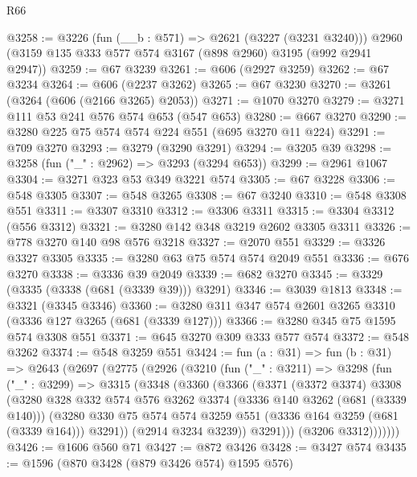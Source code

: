 \begin{lexlean}{R66}
\begin{coremodule}
@3258 := @3226
    (fun (__b : @571) => @2621 (@3227 (@3231 @3240)))
    @2960
    (@3159 @135 @333 @577 @574 @3167 (@898 @2960) @3195 (@992 @2941 @2947))
@3259 := @67 @3239
@3261 := @606 (@2927 @3259)
@3262 := @67 @3234
@3264 := @606 (@2237 @3262)
@3265 := @67 @3230
@3270 := @3261 (@3264 (@606 (@2166 @3265) @2053))
@3271 := @1070 @3270
@3279 := @3271 @111 @53 @241 @576 @574 @653 (@547 @653)
@3280 := @667 @3270
@3290 := @3280 @225 @75 @574 @574 @224 @551 (@695 @3270 @11 @224)
@3291 := @709 @3270
@3293 := @3279 (@3290 @3291)
@3294 := @3205 @39
@3298 := @3258 (fun ("_" : @2962) => @3293 (@3294 @653))
@3299 := @2961 @1067
@3304 := @3271 @323 @53 @349 @3221 @574
@3305 := @67 @3228
@3306 := @548 @3305
@3307 := @548 @3265
@3308 := @67 @3240
@3310 := @548 @3308 @551
@3311 := @3307 @3310
@3312 := @3306 @3311
@3315 := @3304 @3312 (@556 @3312)
@3321 := @3280 @142 @348 @3219 @2602 @3305 @3311
@3326 := @778 @3270 @140 @98 @576 @3218
@3327 := @2070 @551
@3329 := @3326 @3327 @3305
@3335 := @3280 @63 @75 @574 @574 @2049 @551
@3336 := @676 @3270
@3338 := @3336 @39 @2049
@3339 := @682 @3270
@3345 := @3329 (@3335 (@3338 (@681 (@3339 @39))) @3291)
@3346 := @3039 @1813
@3348 := @3321 (@3345 @3346)
@3360 := @3280 @311 @347 @574 @2601 @3265 @3310 (@3336 @127 @3265 (@681 (@3339 @127)))
@3366 := @3280 @345 @75 @1595 @574 @3308 @551
@3371 := @645 @3270 @309 @333 @577 @574
@3372 := @548 @3262
@3374 := @548 @3259 @551
@3424 := fun (a : @31) =>
  fun (b : @31) =>
  @2643
    (@2697
      (@2775
        (@2926
          (@3210
            (fun ("_" : @3211) =>
            @3298
              (fun ("_" : @3299) =>
              @3315
                (@3348
                  (@3360
                    (@3366
                      (@3371
                        (@3372 @3374)
                        @3308
                        (@3280
                          @328
                          @332
                          @574
                          @576
                          @3262
                          @3374
                          (@3336 @140 @3262 (@681 (@3339 @140)))
                          (@3280
                            @330
                            @75
                            @574
                            @574
                            @3259
                            @551
                            (@3336 @164 @3259 (@681 (@3339 @164)))
                            @3291))
                        (@2914 @3234 @3239))
                      @3291)))
                (@3206 @3312)))))))
@3426 := @1606 @560 @71
@3427 := @872 @3426
@3428 := @3427 @574
@3435 := @1596 (@870 @3428 (@879 @3426 @574) @1595 @576)

\end{coremodule}
\end{lexlean}

